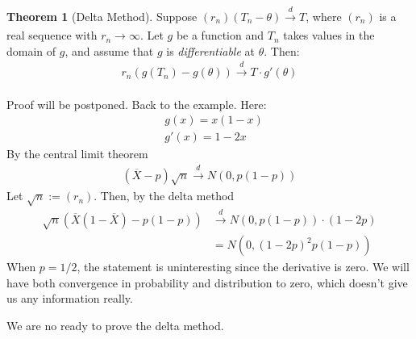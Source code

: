 \documentclass[11pt]{scrartcl}
\theoremstyle{definition}
\newtheorem{theorem}{Theorem}
\theoremstyle{remark}
\begin{document}
{\begin{theorem}[Delta Method]
	Suppose $(r_n)(T_n - \theta) \xrightarrow[]{d} T$, where $(r_n)$ is a real sequence with $r_n \rightarrow \infty$. Let $g$ be a function and $T_n$ takes values in the domain of $g$, and assume that $g$ is \emph{differentiable} at $\theta$. Then: 
	\begin{align}
		r_n ( g(T_n) - g(\theta)) \xrightarrow[]{d} T \cdot g'(\theta) 
	\end{align}
\end{theorem}
Proof will be postponed. Back to the example. Here: 
\begin{align*}
	& g(x) = x(1-x) \\
	& g'(x) = 1-2x 	
\end{align*}
By the central limit theorem
\begin{align*}
	(\overline{X} - p) \sqrt{n} \xrightarrow[]{d} N (0, p(1-p)) 	
\end{align*}
Let $\sqrt{n} := (r_n)$. Then, by the delta method
\begin{align*}
	\sqrt{n} (\overline{X} (1 - \overline{X} ) - p(1-p)) & \xrightarrow[]{d} N(0, p(1-p)) \cdot (1-2p) \\ 
		& = N(0, (1-2p)^2p(1-p)) 
\end{align*}
When $p=1/2$, the statement is uninteresting since the derivative is zero. We will have both convergence in probability and distribution to zero, which doesn't give us any information really. 

We are no ready to prove the delta method. 

}
\end{document}
